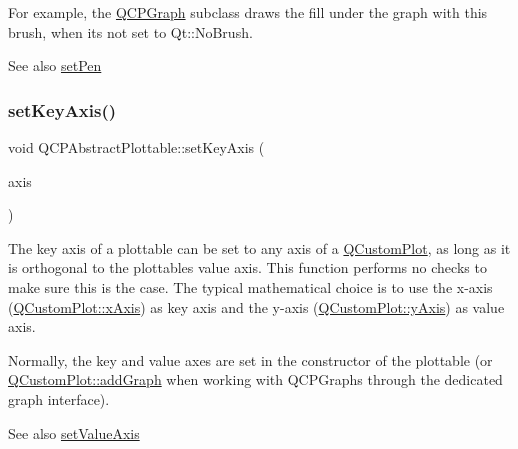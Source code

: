 For example, the \mbox{\hyperlink{class_q_c_p_graph}{Q\+C\+P\+Graph}} subclass draws the fill under the graph with this brush, when it\textquotesingle{}s not set to Qt\+::\+No\+Brush.

\begin{DoxySeeAlso}{See also}
\mbox{\hyperlink{class_q_c_p_abstract_plottable_ab74b09ae4c0e7e13142fe4b5bf46cac7}{set\+Pen}} 
\end{DoxySeeAlso}
\mbox{\label{class_q_c_p_abstract_plottable_a8524fa2994c63c0913ebd9bb2ffa3920}} 
\subsubsection{\texorpdfstring{setKeyAxis()}{setKeyAxis()}}
{\footnotesize\ttfamily void Q\+C\+P\+Abstract\+Plottable\+::set\+Key\+Axis (\begin{DoxyParamCaption}\item[{\mbox{\hyperlink{class_q_c_p_axis}{Q\+C\+P\+Axis}} $\ast$}]{axis }\end{DoxyParamCaption})}

The key axis of a plottable can be set to any axis of a \mbox{\hyperlink{class_q_custom_plot}{Q\+Custom\+Plot}}, as long as it is orthogonal to the plottable\textquotesingle{}s value axis. This function performs no checks to make sure this is the case. The typical mathematical choice is to use the x-\/axis (\mbox{\hyperlink{class_q_custom_plot_a9a79cd0158a4c7f30cbc702f0fd800e4}{Q\+Custom\+Plot\+::x\+Axis}}) as key axis and the y-\/axis (\mbox{\hyperlink{class_q_custom_plot_af6fea5679725b152c14facd920b19367}{Q\+Custom\+Plot\+::y\+Axis}}) as value axis.

Normally, the key and value axes are set in the constructor of the plottable (or \mbox{\hyperlink{class_q_custom_plot_a6fb2873d35a8a8089842d81a70a54167}{Q\+Custom\+Plot\+::add\+Graph}} when working with Q\+C\+P\+Graphs through the dedicated graph interface).

\begin{DoxySeeAlso}{See also}
\mbox{\hyperlink{class_q_c_p_abstract_plottable_a71626a07367e241ec62ad2c34baf21cb}{set\+Value\+Axis}} 
\end{DoxySeeAlso}
\mbox{\label{class_q_c_p_abstract_plottable_ab79c7ba76bc7fa89a4b3580e12149f1f}} 
